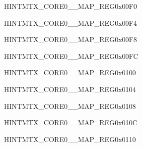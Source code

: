 \begin{register}{H}{INTMTX\_CORE0\_\_MAP\_REG}{0x00F0}\label{regdesc:INTMTXCORE0APBADCINTRMAPREG}
\end{register}\vspace{-3em}


\begin{register}{H}{INTMTX\_CORE0\_\_MAP\_REG}{0x00F4}\label{regdesc:INTMTXCORE0PWMINTRMAPREG}
\end{register}\vspace{-3em}


\begin{register}{H}{INTMTX\_CORE0\_\_MAP\_REG}{0x00F8}\label{regdesc:INTMTXCORE0PCNTINTRMAPREG}
\end{register}\vspace{-3em}


\begin{register}{H}{INTMTX\_CORE0\_\_MAP\_REG}{0x00FC}\label{regdesc:INTMTXCORE0PARLIOINTRMAPREG}
\end{register}\vspace{-3em}




\begin{register}{H}{INTMTX\_CORE0\_\_MAP\_REG}{0x0100}\label{regdesc:INTMTXCORE0SLC0INTRMAPREG}
\end{register}\vspace{-3em}


\begin{register}{H}{INTMTX\_CORE0\_\_MAP\_REG}{0x0104}\label{regdesc:INTMTXCORE0SLC1INTRMAPREG}
\end{register}\vspace{-3em}


\begin{register}{H}{INTMTX\_CORE0\_\_MAP\_REG}{0x0108}\label{regdesc:INTMTXCORE0DMAINCH0INTRMAPREG}
\end{register}\vspace{-3em}


\begin{register}{H}{INTMTX\_CORE0\_\_MAP\_REG}{0x010C}\label{regdesc:INTMTXCORE0DMAINCH1INTRMAPREG}
\end{register}\vspace{-3em}


\begin{register}{H}{INTMTX\_CORE0\_\_MAP\_REG}{0x0110}\label{regdesc:INTMTXCORE0DMAINCH2INTRMAPREG}
\end{register}\vspace{-3em}


